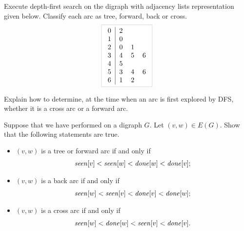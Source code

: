 \begin{Exercise}
\label{ex:DFS-doDFS}

Execute depth-first search on the digraph with adjacency lists
representation  given below. Classify each arc as tree, forward, back or cross.
\newline
$$
\lightgraybox{
	\begin{tabular}{c|cccc}
		0 & 2 &   &   \\
		1 & 0 &   &   \\
		2 & 0 & 1 &   \\
		3 & 4 & 5 & 6 \\
		4 & 5 &   &   \\
		5 & 3 & 4 & 6 \\
		6 & 1 & 2 &   \\
	\end{tabular}
}
$$
\end{Exercise}

\begin{Exercise}
\label{ex:DFS-cross-vs-forward}
Explain how to determine, at the time when an arc is first explored by
DFS, whether it is a cross arc or a forward arc.
\end{Exercise}

\begin{Exercise}
\label{ex:DFS-arc-class}
Suppose that we have performed  on a digraph $G$. Let $(v, w)\in
E(G)$. Show that the following statements are true.
\begin{itemize}
\item
$(v, w)$ is a tree or forward arc if and only if  
$$\operatorname{\text{\textit{seen}}}[v] < \operatorname{\text{\textit{seen}}}[w] < \operatorname{\text{\textit{done}}}[w] < \operatorname{\text{\textit{done}}}[v];$$
\item
$(v, w)$ is a back arc if and only if
$$\operatorname{\text{\textit{seen}}}[w] <  \operatorname{\text{\textit{seen}}}[v] < \operatorname{\text{\textit{done}}}[v] < \operatorname{\text{\textit{done}}}[w];$$ 
\item
$(v, w)$ is a cross arc if and only if 
$$\operatorname{\text{\textit{seen}}}[w] < \operatorname{\text{\textit{done}}}[w]  < \operatorname{\text{\textit{seen}}}[v] < \operatorname{\text{\textit{done}}}[v].$$
\end{itemize}
\end{Exercise}

